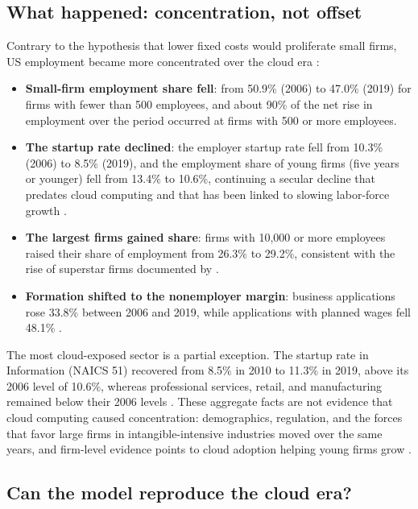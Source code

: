 \subsection{What happened: concentration, not offset}\label{sec:cloud-findings}

Contrary to the hypothesis that lower fixed costs would proliferate small firms, US employment became more concentrated over the cloud era \citep{bds2021}:

\begin{itemize}
  \item \textbf{Small-firm employment share fell}: from 50.9\% (2006) to 47.0\% (2019) for firms with fewer than 500 employees, and about 90\% of the net rise in employment over the period occurred at firms with 500 or more employees.
  \item \textbf{The startup rate declined}: the employer startup rate fell from 10.3\% (2006) to 8.5\% (2019), and the employment share of young firms (five years or younger) fell from 13.4\% to 10.6\%, continuing a secular decline that predates cloud computing \citep{decker2016declining} and that has been linked to slowing labor-force growth \citep{karahan2024demographic,hopenhayn2022population}.
  \item \textbf{The largest firms gained share}: firms with 10,000 or more employees raised their share of employment from 26.3\% to 29.2\%, consistent with the rise of superstar firms documented by \citet{autor2020fall}.
  \item \textbf{Formation shifted to the nonemployer margin}: business applications rose 33.8\% between 2006 and 2019, while applications with planned wages fell 48.1\% \citep{bfs2026}.
\end{itemize}

The most cloud-exposed sector is a partial exception.
The startup rate in Information (NAICS 51) recovered from 8.5\% in 2010 to 11.3\% in 2019, above its 2006 level of 10.6\%, whereas professional services, retail, and manufacturing remained below their 2006 levels \citep{bds2021}.
These aggregate facts are not evidence that cloud computing caused concentration: demographics, regulation, and the forces that favor large firms in intangible-intensive industries \citep{deridder2024market,aghion2023falling} moved over the same years, and firm-level evidence points to cloud adoption helping young firms grow \citep{destefano2023cloud}.

\subsection{Can the model reproduce the cloud era?}\label{sec:cloud-mechanism}

